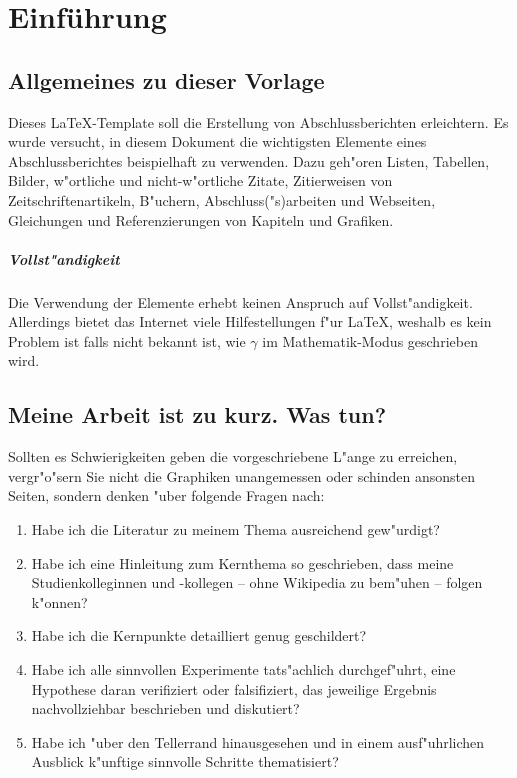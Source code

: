 \chapter{Einführung}
\label{chap:einfuehrung}

\section{Allgemeines zu dieser Vorlage}
\label{sec:Vorlage}
Dieses \LaTeX-Template soll die Erstellung von Abschlussberichten erleichtern. Es wurde versucht, in diesem Dokument die wichtigsten Elemente eines Abschlussberichtes beispielhaft zu verwenden.
Dazu geh"oren Listen, Tabellen, Bilder, w"ortliche und nicht-w"ortliche Zitate, Zitierweisen von Zeitschriftenartikeln, B"uchern, Abschluss("s)arbeiten und Webseiten, Gleichungen und Referenzierungen von Kapiteln und Grafiken.

\paragraph{Vollst"andigkeit}
Die Verwendung der Elemente erhebt keinen Anspruch auf Vollst"andigkeit.
Allerdings bietet das Internet\cite{onlineLatexHilfe} viele Hilfestellungen f"ur \LaTeX, weshalb es kein Problem ist falls nicht bekannt ist, wie $\gamma$ im Mathematik-Modus geschrieben wird.

\section{Meine Arbeit ist zu kurz. Was tun?}
\label{sec:ZuKurz}

Sollten es Schwierigkeiten geben die vorgeschriebene L"ange zu erreichen, vergr"o"sern Sie nicht die Graphiken unangemessen oder schinden ansonsten Seiten, sondern denken "uber folgende Fragen nach:
\begin{enumerate}
\item Habe ich die Literatur zu meinem Thema ausreichend gew"urdigt?
\item Habe ich eine Hinleitung zum Kernthema so geschrieben, dass meine Studienkolleginnen und -kollegen -- ohne Wikipedia zu bem"uhen -- folgen k"onnen?
\item Habe ich die Kernpunkte detailliert genug geschildert?
\item Habe ich alle sinnvollen Experimente tats"achlich durchgef"uhrt, eine Hypothese daran verifiziert oder falsifiziert, das jeweilige Ergebnis nachvollziehbar beschrieben und diskutiert?
\item Habe ich "uber den Tellerrand hinausgesehen und in einem ausf"uhrlichen Ausblick k"unftige sinnvolle Schritte thematisiert?
\end{enumerate}



